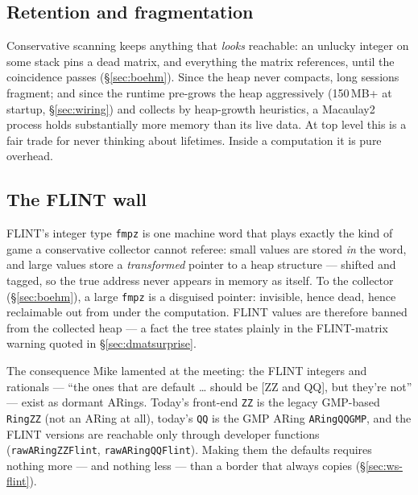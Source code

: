 \documentclass[11pt,oneside]{report}
\newcommand{\code}[1]{\textcolor{m2code}{\texttt{#1}}}
\begin{document}
\subsection{Retention and fragmentation}

Conservative scanning keeps anything that \emph{looks} reachable: an
unlucky integer on some stack pins a dead matrix, and everything the matrix
references, until the coincidence passes (\S\ref{sec:boehm}). Since the
heap never compacts, long sessions fragment; and since the runtime pre-grows
the heap aggressively (150\,MB+ at startup, \S\ref{sec:wiring}) and
collects by heap-growth heuristics, a Macaulay2 process holds
substantially more memory than its live data. At top level this is a fair
trade for never thinking about lifetimes. Inside a computation it is pure
overhead.

\subsection{The FLINT wall}
\label{sec:flintwall}

FLINT's integer type \code{fmpz} is one machine word that plays exactly the
kind of game a conservative collector cannot referee: small values are
stored \emph{in} the word, and large values store a \emph{transformed}
pointer to a heap structure --- shifted and tagged, so the true address
never appears in memory as itself. To the collector (\S\ref{sec:boehm}),
a large \code{fmpz} is a disguised pointer: invisible, hence dead, hence
reclaimable out from under the computation. FLINT values are therefore
banned from the collected heap --- a fact the tree states plainly in the
FLINT-matrix warning quoted in \S\ref{sec:dmatsurprise}.

The consequence Mike lamented at the meeting: the FLINT integers and
rationals --- ``the ones that are default \ldots{} should be [ZZ and QQ],
but they're not'' --- exist as dormant ARings. Today's front-end \code{ZZ}
is the legacy GMP-based \code{RingZZ} (not an ARing at all), today's
\code{QQ} is the GMP ARing \code{ARingQQGMP}, and the FLINT versions are
reachable only through developer functions (\code{rawARingZZFlint},
\code{rawARingQQFlint}). Making them the defaults requires nothing more
--- and nothing less --- than a border that always copies
(\S\ref{sec:ws-flint}).
\end{document}
